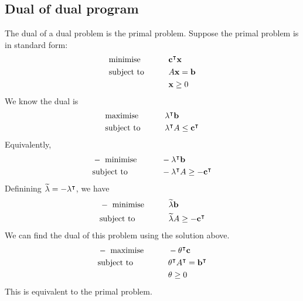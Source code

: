 \subsection{Dual of dual program}
The dual of a dual problem is the primal problem.
Suppose the primal problem is in standard form:
\begin{alignat*}{2}
	 & \text{minimise}   & \qquad & \vb c^\intercal \vb x \\
	 & \text{subject to} &        & A \vb x = \vb b        \\
	 &                   &        & \vb x \geq 0
\end{alignat*}
We know the dual is
\begin{alignat*}{2}
	 & \text{maximise}   & \qquad & \vb \lambda^\intercal \vb b                   \\
	 & \text{subject to} &        & \vb \lambda^\intercal A \leq \vb c^\intercal \\
\end{alignat*}
Equivalently,
\begin{alignat*}{2}
	 & -\text{ minimise} & \qquad & -\vb \lambda^\intercal \vb b                    \\
	 & \text{subject to} &        & -\vb \lambda^\intercal A \geq -\vb c^\intercal \\
\end{alignat*}
Definining \( \widetilde{\vb \lambda} = -\vb\lambda^\intercal \), we have
\begin{alignat*}{2}
	 & -\text{ minimise} & \qquad & \widetilde{\vb \lambda} \vb b                    \\
	 & \text{subject to} &        & \widetilde{\vb \lambda} A \geq -\vb c^\intercal \\
\end{alignat*}
We can find the dual of this problem using the solution above.
\begin{alignat*}{2}
	 & -\text{ maximise} & \qquad & -\vb \theta^\intercal \vb c                          \\
	 & \text{subject to} &        & \vb \theta^\intercal A^\intercal = \vb b^\intercal \\
	 &                   &        & \vb \theta \geq 0
\end{alignat*}
This is equivalent to the primal problem.

